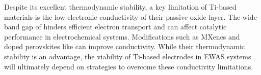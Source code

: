 \documentclass[journal=jacsat,manuscript=article]{achemso}
\begin{document}
Despite its excellent thermodynamic stability, a key limitation of Ti-based materials is the low electronic conductivity of their passive oxide layer. The wide band gap of  hinders efficient electron transport and can affect catalytic performance in electrochemical systems. Modifications such as MXenes \cite{Gardon2013ImprovedSpray, Naguib2012Two-DimensionalCarbides, Hui2022VacancyBatteries} and doped perovskites like  \cite{Sokolov2024ComputationalTitanate} can improve conductivity. While their thermodynamic stability is an advantage, the viability of Ti-based electrodes in EWAS systems will ultimately depend on strategies to overcome these conductivity limitations.
\end{document}
